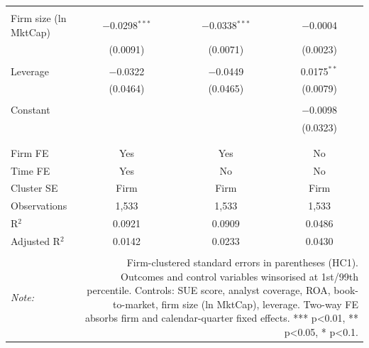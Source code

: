 \begin{table}[!htbp]
\begin{tabular}{@{\extracolsep{5pt}}lccc}
  & & & \\ 
 Firm size (ln MktCap) & $-$0.0298$^{***}$ & $-$0.0338$^{***}$ & $-$0.0004 \\ 
  & (0.0091) & (0.0071) & (0.0023) \\ 
  & & & \\ 
 Leverage & $-$0.0322 & $-$0.0449 & 0.0175$^{**}$ \\ 
  & (0.0464) & (0.0465) & (0.0079) \\ 
  & & & \\ 
 Constant &  &  & $-$0.0098 \\ 
  &  &  & (0.0323) \\ 
  & & & \\ 
\hline \\[-1.8ex] 
Firm FE & Yes & Yes & No \\ 
Time FE & Yes & No & No \\ 
Cluster SE & Firm & Firm & Firm \\ 
Observations & 1,533 & 1,533 & 1,533 \\ 
R$^{2}$ & 0.0921 & 0.0909 & 0.0486 \\ 
Adjusted R$^{2}$ & 0.0142 & 0.0233 & 0.0430 \\ 
\hline 
\hline \\[-1.8ex] 
\textit{Note:}  & \multicolumn{3}{r}{Firm-clustered standard errors in parentheses (HC1). Outcomes and control variables winsorised at 1st/99th percentile. Controls: SUE score, analyst coverage, ROA, book-to-market, firm size (ln MktCap), leverage. Two-way FE absorbs firm and calendar-quarter fixed effects. *** p<0.01, ** p<0.05, * p<0.1.} \\ 
\end{tabular} 
\end{table} 
